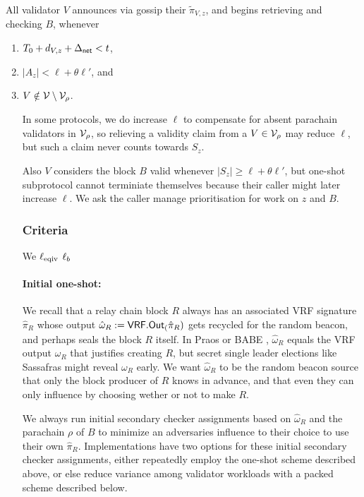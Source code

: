 All validator $V$ announces via gossip their $\tilde{\pi}_{V,z}$, and begins retrieving and checking $B$, whenever
\begin{enumerate}
\item $T_0 + d_{V,z} + \Delta_{\mathsf{net}} < t$,
\item $|A_z| < \ell + \theta \ell'$, and
\item $V \notin \mathcal{V} \setminus \mathcal{V}_\rho$.
\begin{enumerate}
In some protocols, we do increase $\ell$ to compensate for absent parachain validators in $\mathcal{V}_\rho$, so relieving a validity claim from a $V \in \mathcal{V}_\rho$ may reduce $\ell$, but such a claim never counts towards $S_z$.

Also $V$ considers the block $B$ valid whenever $|S_z| \ge \ell + \theta \ell'$, but one-shot subprotocol cannot terminiate themselves because their caller might later increase $\ell$.  We ask the caller manage prioritisation for work on $z$ and $B$.

\subsubsection{Criteria}

We 
$\ell_{\mathrm{eqiv}}$
$\ell_b$

\smallskip
\paragraph{Initial one-shot:}


We recall that a relay chain block $R$ always has an associated VRF signature $\hat{\pi}_R$ whose output $\hat{\omega}_R := \mathsf{VRF}.\mathsf{Out}_(\hat{\pi}_R)$ gets recycled for the random beacon, and perhaps seals the block $R$ itself.  In Praos \cite{Praos} or BABE \cite{BABE}, $\hat{\omega}_R$ equals the VRF output $\omega_R$ that justifies creating $R$, but secret single leader elections like Sassafras \cite{Sassafras} might reveal $\omega_R$ early.  We want $\hat{\omega}_R$ to be the random beacon source that only the block producer of $R$ knows in advance, and that even they can only influence by choosing wether or not to make $R$.

We always run initial secondary checker assignments based on $\hat{\omega}_R$ and the parachain $\rho$ of $B$ to minimize an adversaries influence to their choice to use their own $\hat{\pi}_R$.  Implementations have two options for these initial secondary checker assignments, either repeatedly employ the one-shot scheme described above, or else reduce variance among validator workloads with a packed scheme described below.


\end{enumerate}
\end{enumerate}
